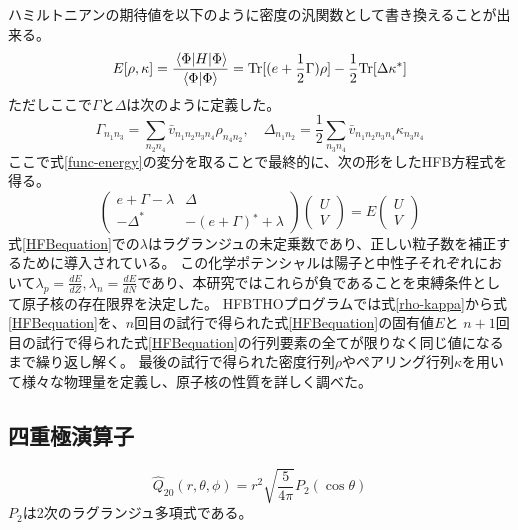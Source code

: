 \documentclass[12pt]{jarticle}
\begin{document}
ハミルトニアンの期待値を以下のように密度の汎関数として書き換えることが出来る。
\begin{equation}
    \label{func-energy}
    E[\rho,\kappa] = \frac{\mel{\Phi}{H}{\Phi}}{\braket{\Phi}{\Phi}} = {\rm Tr}[(e + \frac{1}{2}\Gamma)\rho] - \frac{1}{2}{\rm Tr}[\Delta\kappa^*]
\end{equation}
ただしここで$\Gamma$と$\Delta$は次のように定義した。
\begin{equation}
    \label{Gamma-Delta}
    \Gamma_{n_1 n_3} = \sum_{n_2 n_4}\bar{v}_{n_1 n_2 n_3 n_4}\rho_{n_4 n_2},\quad \Delta_{n_1 n_2} = \frac{1}{2}\sum_{n_3 n_4}\bar{v}_{n_1 n_2 n_3 n_4}\kappa_{n_3 n_4}
\end{equation}
ここで式\eqref{func-energy}の変分を取ることで最終的に、次の形をしたHFB方程式を得る。
\begin{equation}
    \label{HFBequation}
    \begin{pmatrix}
        e + \Gamma - \lambda & \Delta \\
        - \Delta^* & - (e + \Gamma){}^* + \lambda
    \end{pmatrix}
    \left(
        \begin{array}{c}
            U \\
            V
        \end{array}
    \right) =
    E
    \left({}
        \begin{array}{c}
            U \\
            V
        \end{array}
    \right)
\end{equation}
式\eqref{HFBequation}での$\lambda$はラグランジュの未定乗数であり、正しい粒子数を補正するために導入されている。
この化学ポテンシャルは陽子と中性子それぞれにおいて$\lambda_p=\frac{dE}{dZ}, \lambda_n=\frac{dE}{dN}$であり、本研究ではこれらが負であることを束縛条件として原子核の存在限界を決定した。
HFBTHOプログラムでは式\eqref{rho-kappa}から式\eqref{HFBequation}を、$n$回目の試行で得られた式\eqref{HFBequation}の固有値$E$と
$n+1$回目の試行で得られた式\eqref{HFBequation}の行列要素の全てが限りなく同じ値になるまで繰り返し解く。
最後の試行で得られた密度行列$\rho$やペアリング行列$\kappa$を用いて様々な物理量を定義し、原子核の性質を詳しく調べた。

\subsection{四重極演算子}
\begin{equation}
    \label{quadrupole-moment-func}
    \hat{Q}_{20}(r,\theta,\phi) = r^2 \sqrt{\frac{5}{4\pi}} P_2(\cos{\theta})
\end{equation}
$P_2$は2次のラグランジュ多項式である。
\end{document}
